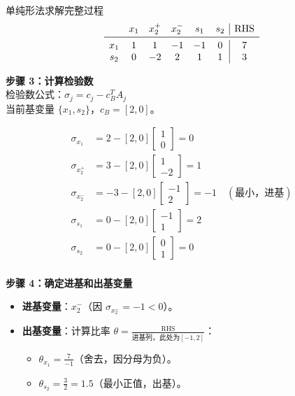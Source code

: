 \begin{exbox}{单纯形法求解完整过程}
        \[
        \begin{array}{cccccc|c}
         & x_1 & x_2^+ & x_2^- & s_1 & s_2 & \text{RHS} \\
        \midrule
        x_1 & 1 & 1 & -1 & -1 & 0 & 7 \\
        s_2 & 0 & -2 & 2 & 1 & 1 & 3 \\
        \end{array}
        \]
        
        \medskip
        
        \textbf{步骤 3：计算检验数}\\
        检验数公式：\( \sigma_j = c_j - c_B^T A_j \) \\
        当前基变量 \( \{x_1, s_2\} \)，\( c_B = [2, 0] \)。
        
        \[
        \begin{align*}
        \sigma_{x_1} &= 2 - [2, 0] \begin{bmatrix}1\\0\end{bmatrix} = 0 \\
        \sigma_{x_2^+} &= 3 - [2, 0] \begin{bmatrix}1\\-2\end{bmatrix} = 1 \\
        \sigma_{x_2^-} &= -3 - [2, 0] \begin{bmatrix}-1\\2\end{bmatrix} = -1 \quad (\text{最小，进基}) \\
        \sigma_{s_1} &= 0 - [2, 0] \begin{bmatrix}-1\\1\end{bmatrix} = 2 \\
        \sigma_{s_2} &= 0 - [2, 0] \begin{bmatrix}0\\1\end{bmatrix} = 0 \\
        \end{align*}
        \]
        
        \medskip
        
        \textbf{步骤 4：确定进基和出基变量}
        \begin{itemize}
          \item \textbf{进基变量}：\( x_2^- \)（因 \( \sigma_{x_2^-} = -1 < 0 \)）。
          \item \textbf{出基变量}：计算比率 \( \theta = \frac{\text{RHS}}{\text{进基列，此处为}[-1, 2]} \)：
            \begin{itemize}
              \item \( \theta_{x_1} = \frac{7}{-1} \)（舍去，因分母为负）。
              \item \( \theta_{s_2} = \frac{3}{2} = 1.5 \)（最小正值，出基）。
            \end{itemize}
        \end{itemize}
        

\end{exbox}
